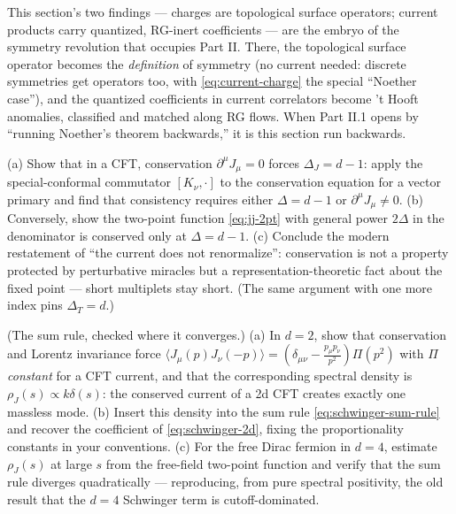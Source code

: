 \begin{ppreview}
This section's two findings --- charges are topological surface operators;
current products carry quantized, RG-inert coefficients --- are the embryo of
the symmetry revolution that occupies Part II. There, the topological
surface operator becomes the \emph{definition} of symmetry (no current
needed: discrete symmetries get operators too, with \eqref{eq:current-charge}
the special ``Noether case''), and the quantized coefficients in current
correlators become 't Hooft anomalies, classified and matched along RG flows.
When Part II.1 opens by ``running Noether's theorem backwards,'' it is this
section run backwards.
\end{ppreview}

\begin{exercise}[medium]
\label{exr:current-dimension}
(a) Show that in a CFT, conservation $\partial^\mu J_\mu = 0$ forces $\Delta_J
= d-1$: apply the special-conformal commutator $[K_\nu, \cdot]$ to the
conservation equation for a vector primary and find that consistency requires
either $\Delta = d - 1$ or $\partial^\mu J_\mu \neq 0$. (b) Conversely, show
the two-point function \eqref{eq:jj-2pt} with general power $2\Delta$ in the
denominator is conserved only at $\Delta = d-1$. (c) Conclude the modern
restatement of ``the current does not renormalize'': conservation is not a
property protected by perturbative miracles but a representation-theoretic
fact about the fixed point --- short multiplets stay short. (The same
argument with one more index pins $\Delta_T = d$.)
\end{exercise}

\begin{exercise}[medium]
\label{exr:sum-rule}
(The sum rule, checked where it converges.) (a) In $d = 2$, show that
conservation and Lorentz invariance force $\langle J_\mu(p) J_\nu(-p)\rangle
= \left(\delta_{\mu\nu} - \frac{p_\mu p_\nu}{p^2}\right)\Pi(p^2)$ with $\Pi$
\emph{constant} for a CFT current, and that the corresponding spectral
density is $\rho_J(s) \propto k\delta(s)$: the conserved current of a 2d
CFT creates exactly one massless mode. (b) Insert this density into the
sum rule \eqref{eq:schwinger-sum-rule} and recover the coefficient of
\eqref{eq:schwinger-2d}, fixing the proportionality constants in your
conventions. (c) For the free Dirac fermion in $d = 4$, estimate
$\rho_J(s)$ at large $s$ from the free-field two-point function and verify
that the sum rule diverges quadratically --- reproducing, from pure
spectral positivity, the old result that the $d=4$ Schwinger term is
cutoff-dominated.
\end{exercise}

